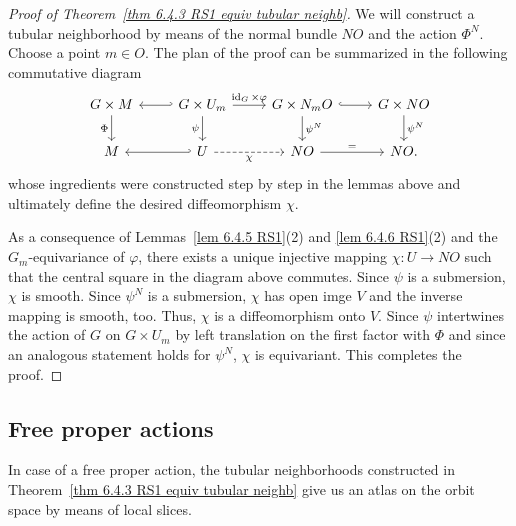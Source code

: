 \begin{proof}[Proof of Theorem~\ref{thm 6.4.3 RS1 equiv tubular neighb}]
    We will construct a tubular neighborhood by means of the normal bundle $NO$ and the action $\Phi^N$. Choose a point $m\in O$. The plan of the proof can be summarized in the following commutative diagram
    \[
    \begin{tikzcd}[every matrix/.append style={name=m}]
       G\times M\arrow[d,"\Phi",swap]\arrow[hookleftarrow]{r} &  G\times U_m \arrow[r,"\id_G\times \varphi"]\arrow[d,"\psi",swap] & G\times N_mO \arrow[d,"\psi^N"]\arrow[hookrightarrow]{r}& G\times NO\arrow[d,"\psi^N"]\\
       M\arrow[hookleftarrow]{r}&  U \arrow[r,"\chi",dashed,swap] & NO \arrow[r,"="]& NO.
    \end{tikzcd}\label{eq 6.4.1 RS1}
    \]
    whose ingredients were constructed step by step in the lemmas above and ultimately define the desired diffeomorphism $\chi$.

    As a consequence of Lemmas~\ref{lem 6.4.5 RS1}(2) and \ref{lem 6.4.6 RS1}(2) and the $G_m$-equivariance of $\varphi$, there exists a unique injective mapping $\chi:U\to NO$ such that the central square in the diagram above commutes. Since $\psi$ is a submersion, $\chi$ is smooth. Since $\psi^N$ is a submersion, $\chi$ has open imge $V$ and the inverse mapping is smooth, too. Thus, $\chi$ is a diffeomorphism onto $V$. Since $\psi$ intertwines the action of $G$ on $G\times U_m$ by left translation on the first factor with $\Phi$  and since an analogous statement holds for $\psi^N$, $\chi$ is equivariant. This completes the proof.
\end{proof}




\subsection{Free proper actions}\label{sec: free proper actions}

In case of a free proper action, the tubular neighborhoods constructed in Theorem~\ref{thm 6.4.3 RS1 equiv tubular neighb} give us an atlas on the orbit space by means of local slices.

